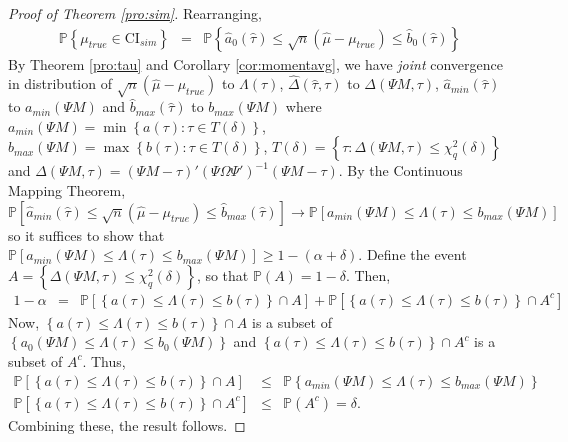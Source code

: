 \documentclass[12pt]{article}
\newcommand{\p}{\mathbb{P}}
\theoremstyle{definition}
\begin{document}
\begin{proof}[Proof of Theorem \ref{pro:sim}]
Rearranging,
	\begin{eqnarray*}	
		\p\left\{\mu_{true} \in \mbox{CI}_{sim} \right\} %
		&=& \p\left\{\widehat{a}_0(\widehat{\tau}) \leq  \sqrt{n}\left(\widehat{\mu} - \mu_{true}\right) \leq \widehat{b}_0(\widehat{\tau}) \right\}
\end{eqnarray*}
By Theorem \ref{pro:tau} and Corollary \ref{cor:momentavg}, we have \emph{joint} convergence in distribution of $\sqrt{n}(\hat{\mu} - \mu_{true})$ to $\Lambda(\tau)$, $\widehat{\Delta}(\widehat{\tau},\tau)$ to $\Delta(\Psi M,\tau)$, $\widehat{a}_{min}(\widehat{\tau})$ to $a_{min}(\Psi M)$ and $\widehat{b}_{max}(\widehat{\tau})$ to $b_{max}(\Psi M)$ where
$a_{min}(\Psi M)=\min \left\{a(\tau)\colon \tau \in T(\delta)\right\}$, $b_{max}(\Psi M)=\max \left\{b(\tau)\colon \tau \in T(\delta)\right\}$, $T(\delta) = \left\{\tau \colon  \Delta(\Psi M, \tau) \leq \chi^2_q(\delta) \right\}$ and $\Delta(\Psi M, \tau)=\left(\Psi M - \tau \right)'\left(\Psi \Omega \Psi'\right)^{-1}\left(\Psi M - \tau \right)$.
By the Continuous Mapping Theorem,
	$$\p\left[  \widehat{a}_{min}(\widehat{\tau}) \leq \sqrt{n}\left( \widehat{\mu}-\mu_{true}\right)\leq  \widehat{b}_{max}(\widehat{\tau}) \right] \rightarrow\p \left[ a_{min}(\Psi M) \leq \Lambda(\tau) \leq b_{max}(\Psi M)\right]$$
so it suffices to show that $\p \left[ a_{min}(\Psi M) \leq \Lambda(\tau) \leq b_{max}(\Psi M)\right]\geq 1 - (\alpha + \delta).$
Define the event $A = \left\{ \Delta(\Psi M, \tau) \leq \chi^2_q(\delta) \right\}$, so that $\p(A) = 1-\delta$. Then,
	\begin{eqnarray*}
		1-\alpha %
			&=& \p\left[\left\{a(\tau) \leq \Lambda(\tau) \leq b(\tau)  \right\}\cap A \right] + \p\left[\left\{a(\tau) \leq \Lambda(\tau) \leq b(\tau)  \right\}\cap A^c \right] 
\end{eqnarray*}
Now, $\left\{a(\tau) \leq \Lambda(\tau) \leq b(\tau)  \right\}\cap A$ is a subset of $\left\{a_0(\Psi M)  \leq \Lambda(\tau) \leq b_0(\Psi M)\right\}$ and  $\left\{a(\tau) \leq \Lambda(\tau) \leq b(\tau)  \right\}\cap A^c$ is a subset of $A^c$. Thus, 
\begin{eqnarray*}
\p\left[\left\{a(\tau) \leq \Lambda(\tau) \leq b(\tau)  \right\}\cap A \right]  &\leq& \p \left\{a_{min}(\Psi M)  \leq \Lambda(\tau) \leq b_{max}(\Psi M)\right\}\\
\p\left[\left\{a(\tau) \leq \Lambda(\tau) \leq b(\tau)  \right\}\cap A^c \right]  &\leq& \p(A^c) = \delta.
\end{eqnarray*}
Combining these, the result follows.
\end{proof}
\end{document}
